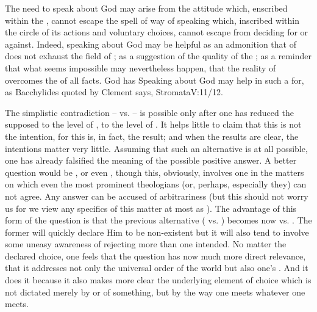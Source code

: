 \pa The need to speak about God may arise from the  attitude
which, enscribed within the \hoa, cannot escape the spell of  way
of speaking which, inscribed within the circle of its actions and voluntary
choices, cannot escape from deciding for or against. 
Indeed, speaking about God may be helpful as an admonition that
 of  does not exhaust the field of ;
as a suggestion of the quality of the ; as a reminder that
what seems impossible may nevertheless happen, that the reality of 
overcomes the  of all facts.  God has  Speaking about God may help in such a
 for, as Bacchylides quoted by Clement says, \citet{one becomes wise
  from another, both in past times and at present, for it is not very easy to
  find the portals of unutterable words. [...] We speak not
  as supplying His name; but [...] we use good names, in order that the mind may
  have these as points of support, so as not to err in other
  respects.}{Stromata}{V:11/12.}


The simplistic contradiction --  vs.  -- is
possible only after one has reduced the supposed  to the
level of , to the level of . It helps
little to claim that this is not the intention, for this is, in fact, the
result; and when the results are clear, the intentions matter very little. Assuming
that such an alternative is at all possible, one has already falsified the
meaning of the possible positive answer. 
%
A better question would be , or even , though this, obviously, involves one in the matters on which even
the most prominent theologians (or, perhaps, especially they) can not agree.
Any  answer can be accused of arbitrariness (but this should not
worry us for we view any specifics of this matter at most as ).
The advantage of this form of the question is that the previous alternative
( vs. ) becomes now  vs. . The former will quickly declare Him to be non-existent but
it will also tend to involve some uneasy awareness of rejecting more than one
intended.
%
No matter the declared choice, one feels that the question has now much more
direct relevance, that it addresses not only the universal order of the 
 world but also one's . And it does it because it
also makes more clear the 
underlying element of choice which is not dictated merely by  
or  of something, but by the way one meets whatever one meets. 


